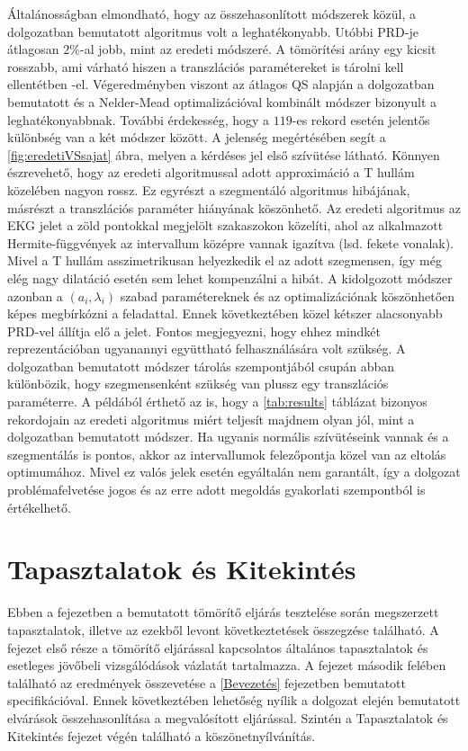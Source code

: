 \documentclass[oneside,titlepage,12pt,a4paper]{report}
\begin{document}
Általánosságban elmondható, hogy az összehasonlított módszerek közül, a dolgozatban bemutatott algoritmus volt a leghatékonyabb. Utóbbi PRD-je átlagosan $2\%$-al jobb, mint az eredeti módszeré. A tömörítési arány egy kicsit rosszabb, ami várható hiszen a transzlációs paramétereket is tárolni kell ellentétben \cite{hexp1}-el. Végeredményben viszont az átlagos QS alapján a dolgozatban bemutatott és a Nelder-Mead optimalizációval kombinált módszer bizonyult a leghatékonyabbnak. További érdekesség, hogy a $119$-es rekord esetén jelentős különbség van a két módszer között. A jelenség megértésében segít a \ref{fig:eredetiVSsajat} ábra, melyen a kérdéses jel első szívütése látható. Könnyen észrevehető, hogy az eredeti algoritmussal adott approximáció a T hullám közelében nagyon rossz. Ez egyrészt a szegmentáló algoritmus hibájának, másrészt a transzlációs paraméter hiányának köszönhető. Az eredeti algoritmus az EKG jelet a zöld pontokkal megjelölt szakaszokon közelíti, ahol az alkalmazott Hermite-függvények az intervallum középre vannak igazítva (lsd. fekete vonalak). Mivel a T hullám asszimetrikusan helyezkedik el az adott szegmensen, így még elég nagy dilatáció esetén sem lehet kompenzálni a hibát. A kidolgozott módszer azonban a $(a_i,\lambda_i)$ szabad paramétereknek és az optimalizációnak köszönhetően képes megbírkózni a feladattal. Ennek következtében közel kétszer alacsonyabb PRD-vel állítja elő a jelet. Fontos megjegyezni, hogy ehhez mindkét reprezentációban ugyanannyi együttható felhasználására volt szükség. A dolgozatban bemutatott módszer tárolás szempontjából csupán abban különbözik, hogy szegmensenként szükség van plussz egy transzlációs paraméterre. A példából érthető az is, hogy a \ref{tab:results} táblázat bizonyos rekordojain az eredeti algoritmus miért teljesít majdnem olyan jól, mint a dolgozatban bemutatott módszer. Ha ugyanis normális szívütéseink vannak és a szegmentálás is pontos, akkor az intervallumok felezőpontja közel van az eltolás optimumához. Mivel ez valós jelek esetén egyáltalán nem garantált, így a dolgozat problémafelvetése jogos és az erre adott megoldás gyakorlati szempontból is értékelhető.

\chapter{Tapasztalatok és Kitekintés}

Ebben a fejezetben a bemutatott tömörítő eljárás tesztelése során megszerzett tapasztalatok, illetve az ezekből levont következtetések összegzése található. A fejezet első része a tömörítő eljárással kapcsolatos általános tapasztalatok és esetleges jövőbeli vizsgálódások vázlatát tartalmazza. A fejezet második felében található az eredmények összevetése a \ref{Bevezetés} fejezetben bemutatott specifikációval. Ennek következtében lehetőség nyílik a dolgozat elején bemutatott elvárások összehasonlítása a megvalósított eljárással. Szintén a Tapasztalatok és Kitekintés fejezet végén található a köszönetnyílvánítás.  
\end{document}
